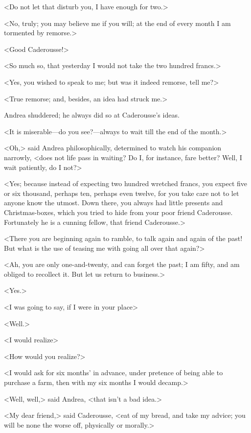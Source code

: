  <Do not let that disturb you, I have enough for two.> 

 <No, truly; you may believe me if you will; at the end of every month I am tormented by remorse.> 

 <Good Caderousse!> 

 <So much so, that yesterday I would not take the two hundred francs.> 

 <Yes, you wished to speak to me; but was it indeed remorse, tell me?> 

 <True remorse; and, besides, an idea had struck me.> 

 Andrea shuddered; he always did so at Caderousse's ideas. 

 <It is miserable—do you see?—always to wait till the end of the month.> 

 <Oh,> said Andrea philosophically, determined to watch his companion narrowly, <does not life pass in waiting? Do I, for instance, fare better? Well, I wait patiently, do I not?> 

 <Yes; because instead of expecting two hundred wretched francs, you expect five or six thousand, perhaps ten, perhaps even twelve, for you take care not to let anyone know the utmost. Down there, you always had little presents and Christmas-boxes, which you tried to hide from your poor friend Caderousse. Fortunately he is a cunning fellow, that friend Caderousse.> 

 <There you are beginning again to ramble, to talk again and again of the past! But what is the use of teasing me with going all over that again?> 

 <Ah, you are only one-and-twenty, and can forget the past; I am fifty, and am obliged to recollect it. But let us return to business.> 

 <Yes.> 

 <I was going to say, if I were in your place\longdash> 

 <Well.> 

 <I would realize\longdash> 

 <How would you realize?> 

 <I would ask for six months' in advance, under pretence of being able to purchase a farm, then with my six months I would decamp.> 

 <Well, well,> said Andrea, <that isn't a bad idea.> 

 <My dear friend,> said Caderousse, <eat of my bread, and take my advice; you will be none the worse off, physically or morally.> 

